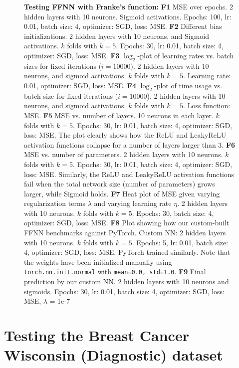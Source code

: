 \documentclass{article}
\begin{document}
\begin{figure}[htbp]
{\begin{minipage}{\textwidth}
        \vspace{1em}
        \caption*{\textbf{Testing FFNN with Franke’s function: }
        \textbf{F1} MSE over epochs. 2 hidden layers with 10 neurons. Sigmoid activations. Epochs: 100, lr: 0.01, batch size: 4, optimizer: SGD, loss: MSE. 
        \textbf{F2} Different bias initializations. 2 hidden layers with 10 neurons, and Sigmoid activations. $k$ folds with $k=5$. Epochs: 30, lr: 0.01, batch size: 4, optimizer: SGD, loss: MSE. 
        \textbf{F3} $\log_2$-plot of learning rates vs. batch sizes for fixed iterations ($i = 10000$). 2 hidden layers with 10 neurons, and sigmoid activations. $k$ folds with $k=5$. Learning rate: 0.01, optimizer: SGD, loss: MSE. 
        \textbf{F4} $\log_2$-plot of time usage vs. batch size for fixed iterations ($i = 10000$). 2 hidden layers with 10 neurons, and sigmoid activations. $k$ folds with $k=5$. Loss function: MSE. 
        \textbf{F5} MSE vs. number of layers. 10 neurons in each layer. $k$ folds with $k=5$. Epochs: 30, lr: 0.01, batch size: 4, optimizer: SGD, loss: MSE. The plot clearly shows how the ReLU and LeakyReLU activation functions collapse for a number of layers larger than 3. 
        \textbf{F6} MSE vs. number of parameters. 2 hidden layers with 10 neurons. $k$ folds with $k=5$. Epochs: 30, lr: 0.01, batch size: 4, optimizer: SGD, loss: MSE. Similarly, the ReLU and LeakyReLU activation functions fail when the total network size (number of parameters) grows larger, while Sigmoid holds. 
        \textbf{F7} Heat plot of MSE given varying regularization terms $\lambda$ and varying learning rate $\eta$. 2 hidden layers with 10 neurons. $k$ folds with $k=5$. Epochs: 30, batch size: 4, optimizer: SGD, loss: MSE.  
        \textbf{F8} Plot showing how our custom-built FFNN benchmarks against PyTorch. Custom NN: 2 hidden layers with 10 neurons. $k$ folds with $k=5$. Epochs: 5, lr: 0.01, batch size: 4, optimizer: SGD, loss: MSE. PyTorch trained similarly. Note that the weights have been initialized manually using \texttt{torch.nn.init.normal} with \texttt{mean=0.0, std=1.0}.
        \textbf{F9} Final prediction by our custom NN. 2 hidden layers with 10 neurons and sigmoids. Epochs: 30, lr: 0.01, batch size: 4, optimizer: SGD, loss: MSE, $\lambda$ = 1e-7}
        \label{fig:franke_figs}
    \end{minipage}
    }
\end{figure}
\restoregeometry

\newpage
\restoregeometry
\section*{Testing the Breast Cancer Wisconsin (Diagnostic) dataset}
\end{document}

